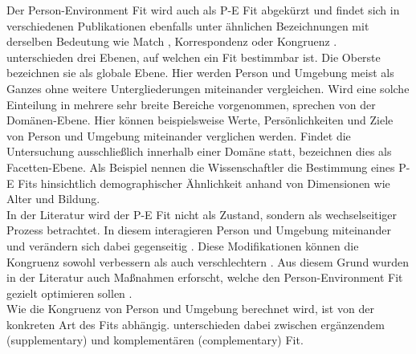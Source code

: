 Der Person-Environment Fit wird auch als P-E Fit abgekürzt \cite[S. 428]{dawis:2002} und findet sich in verschiedenen Publikationen ebenfalls unter ähnlichen Bezeichnungen mit derselben Bedeutung wie Match \cite[S. 2]{player:2017}, Korrespondenz \cite[S. 1]{eggerth:2008} oder Kongruenz \cite[S. 1]{muchinsky:1987}.\\
\textcite[S. 6f.]{edwards:2007} unterschieden drei Ebenen, auf welchen ein Fit bestimmbar ist. Die Oberste bezeichnen sie als globale Ebene. Hier werden Person und Umgebung meist als Ganzes ohne weitere Untergliederungen miteinander vergleichen. Wird eine solche Einteilung in mehrere sehr breite Bereiche vorgenommen, sprechen \textcite[S. 7f.]{edwards:2007} von der Domänen-Ebene. Hier können beispielsweise Werte, Persönlichkeiten und Ziele von Person und Umgebung miteinander verglichen werden. Findet die Untersuchung ausschließlich innerhalb einer Domäne statt, bezeichnen \textcite[S. 7f.]{edwards:2007} dies als Facetten-Ebene. Als Beispiel nennen die Wissenschaftler die Bestimmung eines P-E Fits hinsichtlich demographischer Ähnlichkeit anhand von Dimensionen wie Alter und Bildung.\\
In der Literatur wird der P-E Fit nicht als Zustand, sondern als wechselseitiger Prozess betrachtet. In diesem interagieren Person und Umgebung miteinander und verändern sich dabei gegenseitig \cite[S. 21f.]{roberts:2006}. Diese Modifikationen können die Kongruenz sowohl verbessern als auch verschlechtern \cite[S. 4]{caplan:1987}. Aus diesem Grund wurden in der Literatur auch Maßnahmen erforscht, welche den Person-Environment Fit gezielt optimieren sollen \cite[S. 16]{cable:2001}.\\
Wie die Kongruenz von Person und Umgebung berechnet wird, ist von der konkreten Art des Fits abhängig. \textcite[S. 1]{muchinsky:1987} unterschieden dabei zwischen ergänzendem (supplementary) und komplementären (complementary) Fit.

